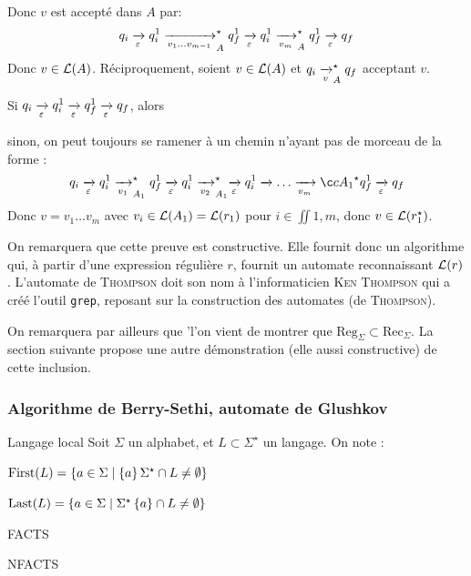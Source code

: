 \documentclass[a4paper,french,bookmarks]{book}
\begin{document}
\begin{nproof}
\begin{enumerate}
            Donc $v$ est accepté dans $A$ par:    
            \[ q_i \lima{\epsilon} q_i^1 \lima{v_1 \dots v_{m-1}}_A^\star q_f^1 \lima{\epsilon} q_i^1 \lima{v_m}_A^\star q_f^1 \lima{\epsilon} q_f \]
            Donc $v \in \mathcal{L}\!\left(A\right)$. Réciproquement, soient $v \in \mathcal{L}\!\left(A\right)$ et $q_i \lima{v}_A^\star q_f$ acceptant $v$.
            \begin{enumerate}
                \ithand Si $q_i \lima{\epsilon} q_i^1 \lima{\epsilon} q_f^1 \lima{\epsilon} q_f$, alors 
                
                \ithand 
                
                \ithand sinon, on peut toujours se ramener à un chemin n'ayant pas de morceau de la forme :
                \[ q_i \lima{\epsilon} q_i^1 \lima{v_1}_{A_1}^\star q_f^1 \lima{\epsilon} q_i^1 \lima{v_2}_{A_1}^\star \lima{\epsilon} q_i^1 \lima \dots \lima{v_m}ç{A_1}^\star q_f^1 \lima{\epsilon} q_f\]
                Donc $v =v_1 \dots v_m$ avec $v_i \in \mathcal{L}\!\left(A_1\right) = \mathcal{L}\!\left(r_1\right)$ pour $i \in \iint{1, m}$, donc $v \in \mathcal{L}\!\left(r_1^\star\right)$.
             \end{enumerate}
        \end{enumerate}
    \end{nproof}
    
    On remarquera que cette preuve est constructive. Elle fournit donc un algorithme qui, à partir d'une expression régulière $r$, fournit un automate reconnaissant $\mathcal{L}\!\left(r\right)$. L'automate de \textsc{Thompson} doit son nom à l'informaticien \textsc{Ken Thompson} qui a créé l'outil \texttt{grep}, reposant sur la construction des automates (de \textsc{Thompson}). 
    
    On remarquera par ailleurs que 'l'on vient de montrer que $\mathrm{Reg}_\Sigma \subset \mathrm{Rec}_\Sigma$. La section suivante propose une autre démonstration (elle aussi constructive) de cette inclusion.
    
    \subsubsection{Algorithme de Berry-Sethi, automate de Glushkov}
        
    \begin{definition}{Langage local}{}
        Soit $\Sigma$ un alphabet, et $L \subset \Sigma^\star$ un langage. On note :
        \begin{enumerate}
            \itast $\First\p{L} = \ens{a \in \Sigma \enstq \ens{a}\Sigma^\star \cap L \neq \emptyset}$
            
            \itast $\Last\p{L} = \ens{a \in \Sigma \enstq \Sigma^\star\ens{a} \cap L \neq \emptyset}$
            
            \itast FACTS
            
            \itast NFACTS
        \end{enumerate}
    \end{definition}
    
\end{document}
